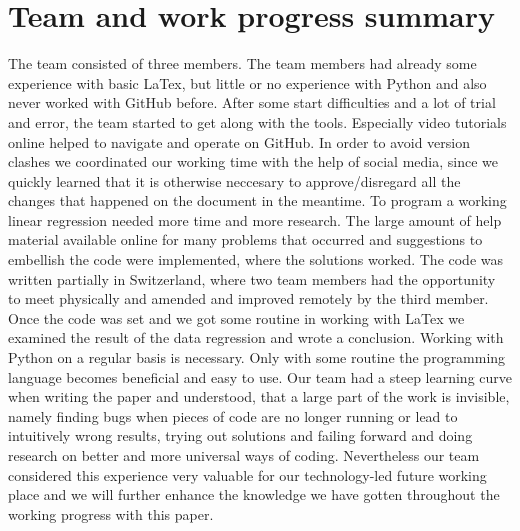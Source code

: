 \documentclass[12pt,a4paper,bibliography=totocnumbered,listof=totocnumbered]{scrartcl}
\begin{document}
\section{Team and work progress summary}
The team consisted of three members. The team members had already some experience with basic LaTex, but little or no experience with Python and also never worked with GitHub before. After some start difficulties and a lot of trial and error, the team started to get along with the tools. Especially video tutorials online helped to navigate and operate on GitHub. In order to avoid version clashes we coordinated our working time with the help of social media, since we quickly learned that it is otherwise neccesary to approve/disregard all the changes that happened on the document in the meantime. To program a working linear regression needed more time and more research. The large amount of help material available online for many problems that occurred and suggestions to embellish the code were implemented, where the solutions worked. The code was written partially in Switzerland, where two team members had the opportunity to meet physically and amended and improved remotely by the third member. Once the code was set and we got some routine in working with LaTex we examined the result of the data regression and wrote a conclusion. Working with Python on a regular basis is necessary. Only with some routine the programming language becomes beneficial and easy to use. Our team had a steep learning curve when writing the paper and understood, that a large part of the work is invisible, namely finding bugs when pieces of code are no longer running or lead to intuitively wrong results, trying out solutions and failing forward and doing research on better and more universal ways of coding. Nevertheless our team considered this experience very valuable for our technology-led future working place and we will further enhance the knowledge we have gotten throughout the working progress with this paper.

%



\end{document}
